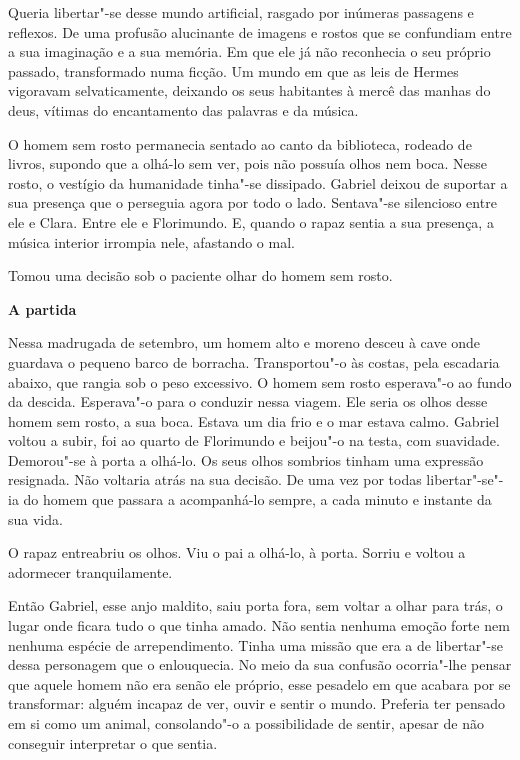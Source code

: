 Queria libertar"-se desse mundo artificial, rasgado por inúmeras
passagens e reflexos. De uma profusão alucinante de imagens e rostos que
se confundiam entre a sua imaginação e a sua memória. Em que ele já não
reconhecia o seu próprio passado, transformado numa ficção. Um mundo em
que as leis de Hermes vigoravam selvaticamente, deixando os seus
habitantes à mercê das manhas do deus, vítimas do encantamento das
palavras e da música.

O homem sem rosto permanecia sentado ao canto da biblioteca, rodeado de
livros, supondo que a olhá-lo sem ver, pois não possuía olhos nem boca.
Nesse rosto, o vestígio da humanidade tinha"-se dissipado. Gabriel deixou
de suportar a sua presença que o perseguia agora por todo o lado.
Sentava"-se silencioso entre ele e Clara. Entre ele e Florimundo. E,
quando o rapaz sentia a sua presença, a música interior irrompia nele,
afastando o mal.

\enlargethispage{\textheight}Tomou uma decisão sob o paciente olhar do homem sem rosto.

\pagebreak

\vspace*{1.8cm}
\noindent{}\textbf{A partida}

\bigskip

Nessa madrugada de setembro, um homem alto e moreno desceu à cave onde
guardava o pequeno barco de borracha. Transportou"-o às costas, pela
escadaria abaixo, que rangia sob o peso excessivo. O homem sem rosto
esperava"-o ao fundo da descida. Esperava"-o para o conduzir nessa viagem.
Ele seria os olhos desse homem sem rosto, a sua boca. Estava um dia frio
e o mar estava calmo. Gabriel voltou a subir, foi ao quarto de
Florimundo e beijou"-o na testa, com suavidade. Demorou"-se à porta a
olhá-lo. Os seus olhos sombrios tinham uma expressão resignada. Não
voltaria atrás na sua decisão. De uma vez por todas libertar"-se"-ia do
homem que passara a acompanhá-lo sempre, a cada minuto e instante da sua
vida.

O rapaz entreabriu os olhos. Viu o pai a olhá-lo, à porta. Sorriu e
voltou a adormecer tranquilamente.

Então Gabriel, esse anjo maldito, saiu porta fora, sem voltar a olhar
para trás, o lugar onde ficara tudo o que tinha amado. Não sentia
nenhuma emoção forte nem nenhuma espécie de arrependimento. Tinha uma
missão que era a de libertar"-se dessa personagem que o enlouquecia. No
meio da sua confusão ocorria"-lhe pensar que aquele homem não era senão
ele próprio, esse pesadelo em que acabara por se transformar: alguém
incapaz de ver, ouvir e sentir o mundo. Preferia ter pensado em si como
um animal, consolando"-o a possibilidade de sentir, apesar de não
conseguir interpretar o que sentia.

